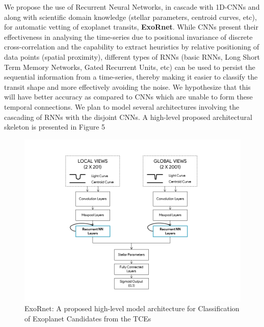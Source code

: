 
We propose the use of Recurrent Neural Networks, in cascade with 1D-CNNs and along with scientific domain knowledge (stellar parameters, centroid curves, etc), for automatic vetting of exoplanet transits, \textbf{ExoRnet}. While CNNs present their effectiveness in analysing the time-series due to positional invariance of discrete cross-correlation and the capability to extract heuristics by relative positioning of data points (spatial proximity), different types of RNNs (basic RNNs, Long Short Term Memory Networks, Gated Recurrent Units, etc) can be used to persist the sequential information from a time-series, thereby making it easier to classify the transit shape and more effectively avoiding the noise. We hypothesize that this will have better accuracy as compared to CNNs which are unable to form these temporal connections. We plan to model several architectures involving the cascading of RNNs with the disjoint CNNs. A high-level proposed architectural skeleton is presented in Figure 5\\

\begin{figure}[H]
    \centering
    \includegraphics[scale=0.5]{Images/RNN_Model.png}
    \caption{ExoRnet: A proposed high-level model architecture for Classification of Exoplanet Candidates from the TCEs}
    \label{fig:Ansdell}
\end{figure}

